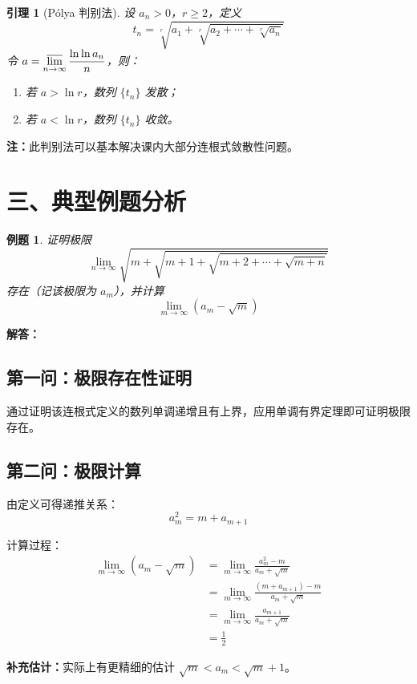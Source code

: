 \documentclass{ctexart}
\newtheorem{lemma}{引理}
\newtheorem{example}{例题}
\begin{document}
	\begin{lemma}[Pólya 判别法]
		设 $ a_n > 0 $，$ r \ge 2 $，定义
		$$ t_n = \sqrt[r]{a_1 + \sqrt[r]{a_2 + \cdots + \sqrt[r]{a_n}}} $$
		令 $ a = \varlimsup\limits_{n \to \infty} \dfrac{\ln \ln a_n}{n} $，则：
		\begin{enumerate}
			\item 若 $ a > \ln r $，数列 $ \{t_n\} $ 发散；
			\item 若 $ a < \ln r $，数列 $ \{t_n\} $ 收敛。
		\end{enumerate}
	\end{lemma}
	
	\textbf{注：}此判别法可以基本解决课内大部分连根式敛散性问题。
	
	\section*{三、典型例题分析}
	
	\begin{example}
		证明极限
		$$ \lim_{n \to \infty} \sqrt{m + \sqrt{m+1 + \sqrt{m+2 + \cdots + \sqrt{m+n}}}} $$
		存在（记该极限为 $ a_m $），并计算
		$$ \lim_{m \to \infty} (a_m - \sqrt{m}) $$
	\end{example}
	
	\textbf{解答：}
	
	\subsection*{第一问：极限存在性证明}
	通过证明该连根式定义的数列单调递增且有上界，应用单调有界定理即可证明极限存在。
	
	\subsection*{第二问：极限计算}
	由定义可得递推关系：
	$$ a_m^2 = m + a_{m+1} $$
	
	计算过程：
	\begin{align*}
		\lim_{m \to \infty} (a_m - \sqrt{m}) &= \lim_{m \to \infty} \frac{a_m^2 - m}{a_m + \sqrt{m}} \\
		&= \lim_{m \to \infty} \frac{(m + a_{m+1}) - m}{a_m + \sqrt{m}} \\
		&= \lim_{m \to \infty} \frac{a_{m+1}}{a_m + \sqrt{m}} \\
		&= \frac{1}{2}
	\end{align*}
	
	\textbf{补充估计：}实际上有更精细的估计 $ \sqrt{m} < a_m < \sqrt{m} + 1 $。
	
\end{document}

